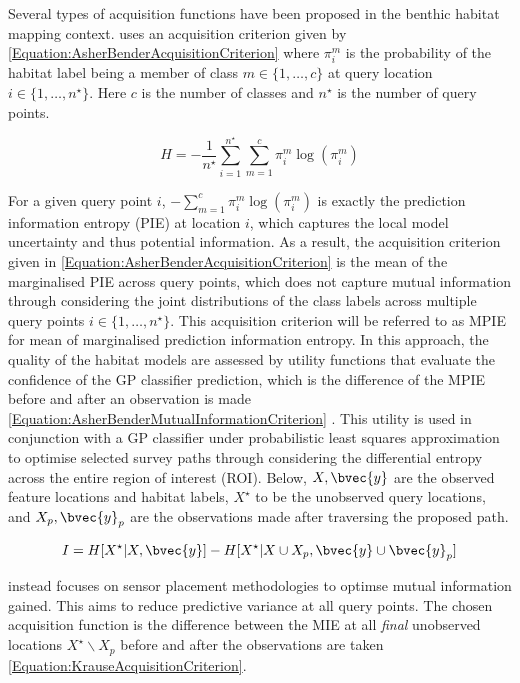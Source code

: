 			Several types of acquisition functions have been proposed in the benthic habitat mapping context. \cite{AsherBender} uses an acquisition criterion given by \eqref{Equation:AsherBenderAcquisitionCriterion} where $\pi^{m}_{i}$ is the probability of the habitat label being a member of class $m \in \{1, \dots, c\}$ at query location $i \in \{1, \dots, n^{\star}\}$. Here $c$ is the number of classes and $n^{\star}$ is the number of query points.
			
			\begin{equation}
				H = - \frac{1}{n^{\star}} \sum_{i = 1}^{n^{\star}} \sum_{m = 1}^{c} \pi^{m}_{i} \log(\pi^{m}_{i})
			\label{Equation:AsherBenderAcquisitionCriterion}
			\end{equation}
			
			For a given query point $i$, $- \sum_{m = 1}^{c} \pi^{m}_{i} \log(\pi^{m}_{i})$ is exactly the prediction information entropy (PIE) at location $i$, which captures the local model uncertainty and thus potential information. As a result, the acquisition criterion given in \eqref{Equation:AsherBenderAcquisitionCriterion} is the mean of the marginalised PIE across query points, which does not capture mutual information through considering the joint distributions of the class labels across multiple query points $i \in \{1, \dots, n^{\star}\}$. This acquisition criterion will be referred to as MPIE for mean of marginalised prediction information entropy. In this approach, the quality of the habitat models are assessed by utility functions that evaluate the confidence of the GP classifier prediction, which is the difference of the MPIE before and after an observation is made \eqref{Equation:AsherBenderMutualInformationCriterion} \citep{Rigby:ROB20372}. This utility is used in conjunction with a GP classifier under probabilistic least squares approximation to optimise selected survey paths through considering the differential entropy across the entire region of interest (ROI). Below, $X, \bvec{y}$ are the observed feature locations and habitat labels, $X^{\star}$ to be the unobserved query locations, and $X_{p}, \bvec{y}_{p}$ are the observations made after traversing the proposed path.
		
			\begin{equation}
				I = H[X^{\star} | X, \bvec{y}] - H[X^{\star} | X \cup X_{p}, \bvec{y} \cup \bvec{y}_{p}]
			\label{Equation:AsherBenderMutualInformationCriterion}
			\end{equation}
			
			\cite{Krause:2008:NSP:1390681.1390689} instead focuses on sensor placement methodologies to optimse mutual information gained. This aims to reduce predictive variance at all query points. The chosen acquisition function is the difference between the MIE at all \textit{final} unobserved locations $X^{\star} \backslash X_{p}$ before and after the observations are taken \eqref{Equation:KrauseAcquisitionCriterion}.
			
